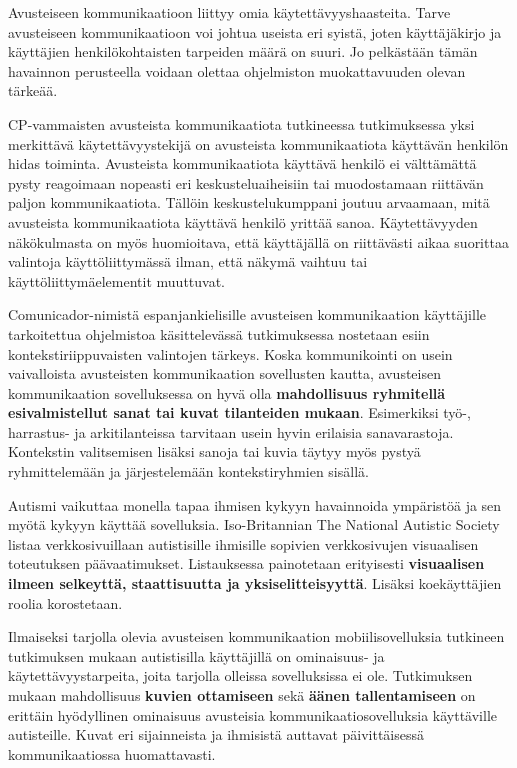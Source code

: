 \documentclass[utf8]{gradu3}
\begin{document}
Avusteiseen kommunikaatioon liittyy omia käytettävyyshaasteita. Tarve avusteiseen kommunikaatioon voi johtua useista eri syistä, joten käyttäjäkirjo ja käyttäjien henkilökohtaisten tarpeiden määrä on suuri. Jo pelkästään tämän havainnon perusteella voidaan olettaa ohjelmiston muokattavuuden olevan tärkeää.

CP-vammaisten avusteista kommunikaatiota tutkineessa tutkimuksessa \parencite[]{classmate-aac-study} yksi merkittävä käytettävyystekijä on avusteista kommunikaatiota käyttävän henkilön hidas toiminta. Avusteista kommunikaatiota käyttävä henkilö ei välttämättä pysty reagoimaan nopeasti eri keskusteluaiheisiin tai muodostamaan riittävän paljon kommunikaatiota. Tällöin keskustelukumppani joutuu arvaamaan, mitä avusteista kommunikaatiota käyttävä henkilö yrittää sanoa. Käytettävyyden näkökulmasta on myös huomioitava, että käyttäjällä on riittävästi aikaa suorittaa valintoja käyttöliittymässä ilman, että näkymä vaihtuu tai käyttöliittymäelementit muuttuvat.

\label{AAC-context-settings}
Comunicador-nimistä espanjankielisille avusteisen kommunikaation käyttäjille tarkoitettua ohjelmistoa käsittelevässä tutkimuksessa \parencite[]{graphic-communicator} nostetaan esiin kontekstiriippuvaisten valintojen tärkeys. Koska kommunikointi on usein vaivalloista avusteisten kommunikaation sovellusten kautta, avusteisen kommunikaation sovelluksessa on hyvä olla \textbf{mahdollisuus ryhmitellä esivalmistellut sanat tai kuvat tilanteiden mukaan}. Esimerkiksi työ-, harrastus- ja arkitilanteissa tarvitaan usein hyvin erilaisia sanavarastoja. Kontekstin valitsemisen lisäksi sanoja tai kuvia täytyy myös pystyä ryhmittelemään ja järjestelemään kontekstiryhmien sisällä.

\label{AAC-staticity}
Autismi vaikuttaa monella tapaa ihmisen kykyyn havainnoida ympäristöä ja sen myötä kykyyn käyttää sovelluksia. Iso-Britannian The National Autistic Society listaa verkkosivuillaan \parencite[]{autism-friendly-websites} autistisille ihmisille sopivien verkkosivujen visuaalisen toteutuksen päävaatimukset. Listauksessa painotetaan erityisesti \textbf{visuaalisen ilmeen selkeyttä, staattisuutta ja yksiselitteisyyttä}. Lisäksi koekäyttäjien roolia korostetaan.

Ilmaiseksi tarjolla olevia avusteisen kommunikaation mobiilisovelluksia tutkineen tutkimuksen \parencite[]{autism-mobile-usability} mukaan autistisilla käyttäjillä on ominaisuus- ja käytettävyystarpeita, joita tarjolla olleissa sovelluksissa ei ole. Tutkimuksen mukaan mahdollisuus \textbf{kuvien ottamiseen} sekä \textbf{äänen tallentamiseen} on erittäin hyödyllinen ominaisuus avusteisia kommunikaatiosovelluksia käyttäville autisteille. Kuvat eri sijainneista ja ihmisistä auttavat päivittäisessä kommunikaatiossa huomattavasti. \label{AAC-photos}
\end{document}
